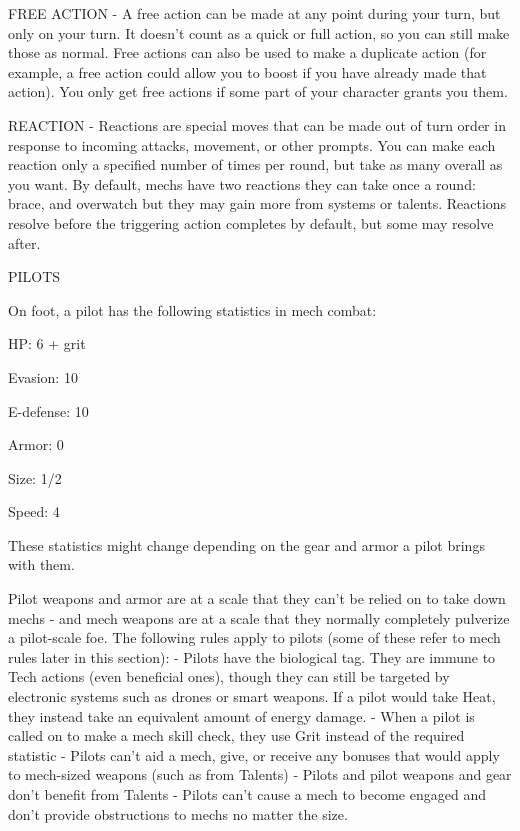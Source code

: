 FREE ACTION - A free action can be made at any point during your turn, but only on your turn. It
doesn’t count as a quick or full action, so you can still make those as normal. Free actions can
also be used to make a duplicate action (for example, a free action could allow you to boost if
you have already made that action). You only get free actions if some part of your character
grants you them.

REACTION - Reactions are special moves that can be made out of turn order in response to
incoming attacks, movement, or other prompts. You can make each reaction only a specified
number of times per round, but take as many overall as you want. By default, mechs have two
reactions they can take once a round: brace, and overwatch but they may gain more from
systems or talents. Reactions resolve before the triggering action completes by default, but
some may resolve after.


                                                      PILOTS

On foot, a pilot has the following statistics in mech combat:

	        HP: 6 + grit

	        Evasion: 10

         E-defense: 10

	        Armor: 0

	        Size: 1/2





	        Speed: 4


These statistics might change depending on the gear and armor a pilot brings with them.


Pilot weapons and armor are at a scale that they can’t be relied on to take down mechs - and
mech weapons are at a scale that they normally completely pulverize a pilot-scale foe. The
following rules apply to pilots (some of these refer to mech rules later in this section):
     -   Pilots have the biological tag. They are immune to Tech actions (even beneficial ones),
         though they can still be targeted by electronic systems such as drones or smart weapons.
         If a pilot would take Heat, they instead take an equivalent amount of energy damage.
     -   When a pilot is called on to make a mech skill check, they use Grit instead of the required
         statistic
     -   Pilots can’t aid a mech, give, or receive any bonuses that would apply to mech-sized
         weapons (such as from Talents)
     -   Pilots and pilot weapons and gear don’t benefit from Talents
     -   Pilots can’t cause a mech to become engaged and don’t provide obstructions to mechs no
         matter the size.

